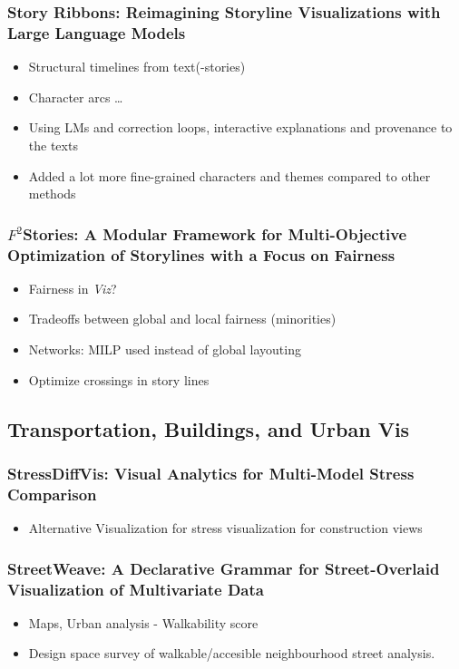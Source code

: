 \documentclass[a4paper]{article}
\begin{document}
\subsubsection{Story Ribbons: Reimagining Storyline Visualizations with Large Language Models}
\begin{itemize}
    \item Structural timelines from text(-stories)
    \item Character arcs \dots
    \item Using LMs and correction loops, interactive explanations and provenance to the texts
    \item Added a lot more fine-grained characters and themes compared to other methods
\end{itemize}
\subsubsection{$F^2$Stories: A Modular Framework for Multi-Objective Optimization of Storylines with a Focus on Fairness}
\begin{itemize}
    \item Fairness in  \textit{Viz}?
    \item Tradeoffs between global and local fairness (minorities)
    \item Networks: MILP used instead of global layouting
    \item Optimize crossings in story lines
\end{itemize}
\subsection{Transportation, Buildings, and Urban Vis}
\subsubsection{StressDiffVis: Visual Analytics for Multi-Model Stress Comparison}
\begin{itemize}
    \item Alternative Visualization for stress visualization for construction views
    
\end{itemize}
\subsubsection{StreetWeave: A Declarative Grammar for Street-Overlaid Visualization of Multivariate Data}
\begin{itemize}
    \item Maps, Urban analysis - Walkability score
    \item Design space survey of walkable/accesible neighbourhood street analysis.
\end{itemize}
\end{document}
